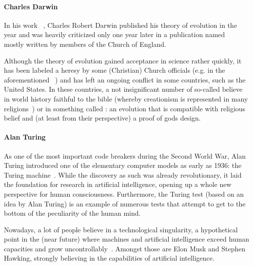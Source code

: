 
\paragraph{Charles Darwin} In his work ~\cite{darwin1859origin}, Charles Robert Darwin published
 his theory of evolution in the year \citeyear{darwin1859origin} and was heavily criticized only one year later in a publication named ~\cite{temple1860essays} mostly written by members of the Church of England.

 Although the theory of evolution gained acceptance in science rather quickly, it has been labeled a heresy by some (Christian) Church officials (e.g. in the aforementioned ~\cite{temple1860essays}) and has left an ongoing conflict in some countries, such as the United States.
 In these countries, a not insignificant number of so-called  believe in world history faithful to the bible (whereby creationism is represented in many religions~\cite{Hameed1637}) or in something called : an evolution that is compatible with religious belief and (at least from their perspective) a proof of gods design.

\paragraph{Alan Turing} As one of the most important code breakers during the Second World War, Alan Turing introduced one of the elementary computer models as early as 1936: the Turing machine~\cite{turing1936turing}.
While the discovery as such was already revolutionary, it laid the foundation for research in artificial intelligence, opening up a whole new perspective for human consciousness.
Furthermore, the Turing test (based on an idea by Alan Turing) is an example of numerous tests that attempt to get to the bottom of the peculiarity of the human mind.

Nowadays, a lot of people believe in a technological singularity, a hypothetical point in the (near future) where machines and artificial intelligence exceed human capacities and grow uncontrollably~\cite{Eden2013}.
Amongst those are Elon Musk and Stephen Hawking, strongly believing in the capabilities of artificial intelligence.


